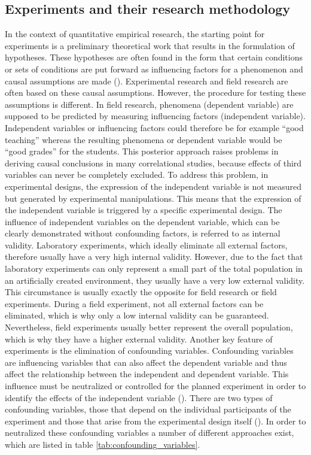 \subsection{Experiments and their research methodology}


In the context of quantitative empirical research, the starting point for experiments is a preliminary theoretical work that results in the formulation of hypotheses. These hypotheses are often found in the form that certain conditions or sets of conditions are put forward as influencing factors for a phenomenon and causal assumptions are made (\cite{Gniewosz.2011}). Experimental research and field research are often based on these causal assumptions. However, the procedure for testing these assumptions is different. In field research, phenomena (dependent variable) are supposed to be predicted by measuring influencing factors (independent variable). Independent variables or influencing factors could therefore be for example \enquote{good teaching} whereas the resulting phenomena or dependent variable would be \enquote{good grades} for the students. This posterior approach raises problems in deriving causal conclusions in many correlational studies, because effects of third variables can never be completely excluded. To address this problem, in experimental designs, the expression of the independent variable is not measured but generated by experimental manipulations. This means that the expression of the independent variable is triggered by a specific experimental design.
The influence of independent variables on the dependent variable, which can be clearly demonstrated without confounding factors, is referred to as internal validity. Laboratory experiments, which ideally eliminate all external factors, therefore usually have a very high internal validity. However, due to the fact that laboratory experiments can only represent a small part of the total population in an artificially created environment, they usually have a very low external validity. This circumstance is usually exactly the opposite for field research or field experiments. During a field experiment, not all external factors can be eliminated, which is why only a low internal validity can be guaranteed. Nevertheless, field experiments usually better represent the overall population, which is why they have a higher external validity. Another key feature of experiments is the elimination of confounding variables. Confounding variables are influencing variables that can also affect the dependent variable and thus affect the relationship between the independent and dependent variable. This influence must be neutralized or controlled for the planned experiment in order to identify the effects of the independent variable (\cite{Gniewosz.2011}). There are two types of confounding variables, those that depend on the individual participants of the experiment and those that arise from the experimental design itself (\cite{Gniewosz.2011}). In order to neutralized these confounding variables a number of different approaches exist, which are listed in table \ref{tab:confounding_variables}.

